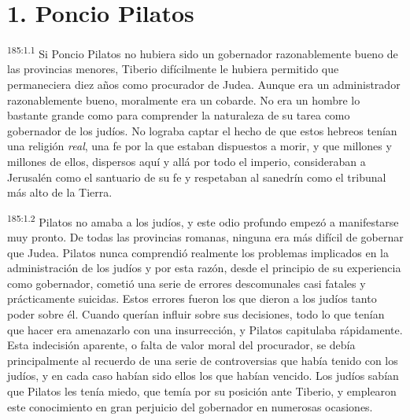 \section*{1. Poncio Pilatos}
\par
\textsuperscript{185:1.1} Si Poncio Pilatos no hubiera sido un gobernador razonablemente bueno de las provincias menores, Tiberio difícilmente le hubiera permitido que permaneciera diez años como procurador de Judea. Aunque era un administrador razonablemente bueno, moralmente era un cobarde. No era un hombre lo bastante grande como para comprender la naturaleza de su tarea como gobernador de los judíos. No lograba captar el hecho de que estos hebreos tenían una religión \textit{real}, una fe por la que estaban dispuestos a morir, y que millones y millones de ellos, dispersos aquí y allá por todo el imperio, consideraban a Jerusalén como el santuario de su fe y respetaban al sanedrín como el tribunal más alto de la Tierra.

\par
\textsuperscript{185:1.2} Pilatos no amaba a los judíos, y este odio profundo empezó a manifestarse muy pronto. De todas las provincias romanas, ninguna era más difícil de gobernar que Judea. Pilatos nunca comprendió realmente los problemas implicados en la administración de los judíos y por esta razón, desde el principio de su experiencia como gobernador, cometió una serie de errores descomunales casi fatales y prácticamente suicidas. Estos errores fueron los que dieron a los judíos tanto poder sobre él. Cuando querían influir sobre sus decisiones, todo lo que tenían que hacer era amenazarlo con una insurrección, y Pilatos capitulaba rápidamente. Esta indecisión aparente, o falta de valor moral del procurador, se debía principalmente al recuerdo de una serie de controversias que había tenido con los judíos, y en cada caso habían sido ellos los que habían vencido. Los judíos sabían que Pilatos les tenía miedo, que temía por su posición ante Tiberio, y emplearon este conocimiento en gran perjuicio del gobernador en numerosas ocasiones.

